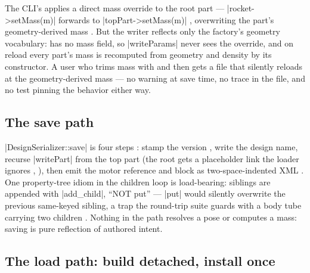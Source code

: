 \begin{hardfail}
The CLI's  applies a direct mass override to the root part ---
\cppinline|rocket->setMass(m)|  forwards to
\cppinline|topPart->setMass(m)| , overwriting the part's
geometry-derived mass . But the writer reflects only the
factory's geometry vocabulary:  has no mass field, so
\cppinline|writeParams|  never sees the override, and
on reload every part's mass is recomputed from geometry and density by its constructor. A
user who trims mass with  and then  gets a file that
silently reloads at the geometry-derived mass --- no warning at save time, no trace in
the file, and no test pinning the behavior either way. \fail
\end{hardfail}

\subsection{The save path}\label{sec:persistence-save}

\cppinline|DesignSerializer::save| is four steps :
stamp the version , write the design name, recurse
\cppinline|writePart| from the top part (the root gets a placeholder link the loader
ignores , ),
then emit the motor reference and  block as two-space-indented XML
. One property-tree idiom in the children loop is
load-bearing: siblings are appended with \cppinline|add_child|, ``NOT put''
 --- \cppinline|put| would silently overwrite the
previous same-keyed sibling, a trap the round-trip suite guards with a body tube carrying
two children . Nothing in the path resolves a
pose or computes a mass: saving is pure reflection of authored intent.

\subsection{The load path: build detached, install once}\label{sec:persistence-load}

